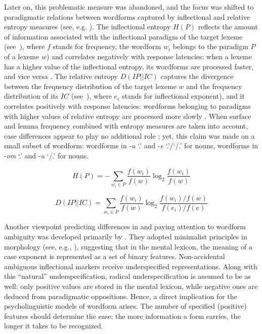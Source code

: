\documentclass[output=paper, modfonts,newtxmath,hidelinks]{langscibook}
\begin{document}
Later on, this problematic measure was abandoned, and the focus was shifted to paradigmatic relations between wordforms captured by inflectional and relative entropy measures (see, e.g. \citealt{milin2009simultaneous}). The inflectional entropy $H(P)$ reflects the amount of information associated with the inflectional paradigm of the target lexeme (see~), where $f$ stands for frequency, the wordform $w_i$ belongs to the paradigm $P$ of a lexeme $w$) and correlates negatively with response latencies: when a lexeme has a higher value of the inflectional entropy, its wordforms are processed faster, and vice versa  \citep{del2004putting}. The relative entropy $D(IP||IC)$ captures the divergence between the frequency distribution of the target lexeme $w$ and the frequency distribution of its  $IC$ (see~), where $e_i$ stands for inflectional exponent), and it correlates positively with response latencies: wordforms belonging to paradigms with higher values of relative entropy are processed more slowly \citep{milin2009simultaneous}. When surface and lemma frequency combined with entropy measures are taken into account, case differences appear to play no additional role \citep{milin2009simultaneous}; yet, this claim was made on a small subset of wordform: wordforms in -\textit{u} `{\accc.\sg}’ and -\textit{e} ‘{\genn.\sg}’\slash ‘{\nomm/\accc.\pl}’ for  nouns, wordforms in -\textit{om} `{\ins.\sg}’ and -\textit{u} `{\datt/\locc.\sg}’ for  nouns.

	\ea\label{equation:inflEntropy}\begin{equation*}
		H(P) = -\sum_{w_i \in P} \frac{f(w_i)}{f(w)} \log _2\frac{f(w_i)}{f(w)}
        \end{equation*}
	\z

\ea\label{equation:relEntr}\begin{equation*}
		D(IP||IC) = \sum_{w_i \in P} \frac{f(w_i)}{f(w)} \log _2 \frac{f(w_i)/f(w)}{f(e_i)/f(e)}
        \end{equation*}
	\z

\noindent Another viewpoint predicting differences in   and paying attention to wordform ambiguity was developed primarily by \citet{clahsen2001mental}. They adopted minimalist principles in morphology (see, e.g., \citealt{wunderlich1996minimalist}), suggesting that in the mental lexicon, the meaning of a case exponent is represented as a set of binary features. Non-accidental ambiguous inflectional markers receive underspecified representations. Along with this ``natural'' underspecification, radical underspecification is assumed to be  as well: only positive values are stored in the mental lexicon, while negative ones are deduced from paradigmatic oppositions. Hence, a direct implication for the psycholinguistic models of wordform  arises. The number of specified (positive) features should determine the  ease: the more information a form carries, the longer it takes to be recognized.
\end{document}
